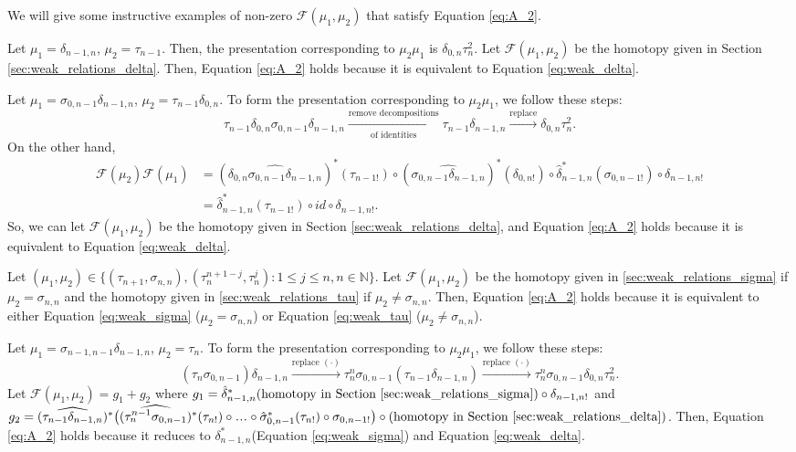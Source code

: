We will give some instructive examples 
of non-zero $\mathcal{F}(\mu_1, \mu_2)$ that satisfy Equation 
\ref{eq:A_2}.
\begin{eg}
Let $\mu_1 = \delta_{n-1,n}$, $\mu_2 = 
\tau_{n-1}$. Then, the presentation 
corresponding to $\mu_2\mu_1$ is 
$\delta_{0,n}\tau_n^2$. Let 
$\mathcal{F}(\mu_1, \mu_2)$ be the homotopy given 
in Section \ref{sec:weak_relations_delta}. 
Then, Equation \ref{eq:A_2} holds because it 
is equivalent to Equation \ref{eq:weak_delta}.
\end{eg}
%
\begin{eg}
Let $\mu_1 = \sigma_{0,n-1} \delta_{n-1,n}$, 
$\mu_2 = \tau_{n-1} \delta_{0,n}$. To 
form the presentation corresponding to 
$\mu_2\mu_1$, we follow these steps: 
$$
\tau_{n-1} \delta_{0,n} \sigma_{0,n-1} 
\delta_{n-1,n} 
\xrightarrow[\textrm{of identities}]{\textrm{remove decompositions}}
\tau_{n-1} \delta_{n-1,n}
\xrightarrow{\textrm{replace}}
\delta_{0,n}\tau_n^2.
$$
On the other hand, 
\begin{align*}
\mathcal{F}(\mu_2)\mathcal{F}(\mu_1) 
&= 
(\widehat{\delta_{0,n}\sigma_{0,n-1}
  \delta_{n-1,n}})^*(\tau_{n-1!}) \circ
  (\widehat{\sigma_{0,n-1}\delta_{n-1,n}})^*
  (\delta_{0,n!}) \circ 
  \hat{\delta}_{n-1,n}^*(\sigma_{0,n-1!}) 
  \circ \delta_{n-1,n!}\\
&= 
\hat{\delta}_{n-1,n}^*(\tau_{n-1!}) \circ
  id \circ \delta_{n-1,n!}.
\end{align*}
So, we can let $\mathcal{F}(\mu_1, \mu_2)$ be the 
homotopy given in Section 
\ref{sec:weak_relations_delta}, and Equation 
\ref{eq:A_2} holds because it is equivalent to Equation 
\ref{eq:weak_delta}.
\end{eg}
%
\begin{eg}
Let $(\mu_1, \mu_2) \in \{ (\tau_{n+1}, 
\sigma_{n,n}), (\tau_{n}^{n+1-j}, 
\tau_n^j): 1\leq j \leq n, n \in \mathbb{N}
\}$. Let $\mathcal{F}(\mu_1, \mu_2)$ be 
the homotopy given in 
\ref{sec:weak_relations_sigma} if $\mu_2 = 
\sigma_{n,n}$ and the homotopy given in 
\ref{sec:weak_relations_tau} if $\mu_2 \neq 
\sigma_{n,n}$. Then, Equation \ref{eq:A_2} 
holds because it 
is equivalent to either Equation 
\ref{eq:weak_sigma} ($\mu_2 = 
\sigma_{n,n}$) or Equation \ref{eq:weak_tau} 
($\mu_2 \neq \sigma_{n,n}$).
\end{eg}
%
\begin{eg}
Let $\mu_1 = \sigma_{n-1,n-1} \delta_{n-1,n}$, 
$\mu_2 = \tau_n$. To 
form the presentation corresponding to 
$\mu_2\mu_1$, we follow these steps: 
$$
(\tau_n \sigma_{0,n-1}) 
\delta_{n-1,n} 
\xrightarrow{\textrm{replace $(\cdot)$}}
\tau_n^n \sigma_{0,n-1}(\tau_{n-1}\delta_{n-1,n})
\xrightarrow{\textrm{replace $(\cdot)$}}
\tau_n^n \sigma_{0,n-1}\delta_{0,n}\tau_n^2.
$$
Let $\mathcal{F}(\mu_1, \mu_2) = g_1 + g_2$ where 
$g_1 = \hat{\delta}_{n-1,n}^*( 
\textrm{homotopy in Section 
\ref{sec:weak_relations_sigma}})\circ
\delta_{n-1,n!}$ and $g_2 = 
(\widehat{\tau_{n-1}\delta_{n-1,n}})^*\big(
(\widehat{\tau_n^{n-1}\sigma_{0,n-1}})^*
  (\tau_{n!}) \circ \smdots \circ 
  \hat{\sigma}_{0,n-1}^*(\tau_{n!}) \circ 
  \sigma_{0,n-1!} \big) \circ 
\textrm{(homotopy in Section 
\ref{sec:weak_relations_delta})}$. 
Then, Equation \ref{eq:A_2} holds because it 
reduces to $\delta_{n-1,n}^*$(Equation 
\ref{eq:weak_sigma}) and Equation 
\ref{eq:weak_delta}.
\end{eg}
%